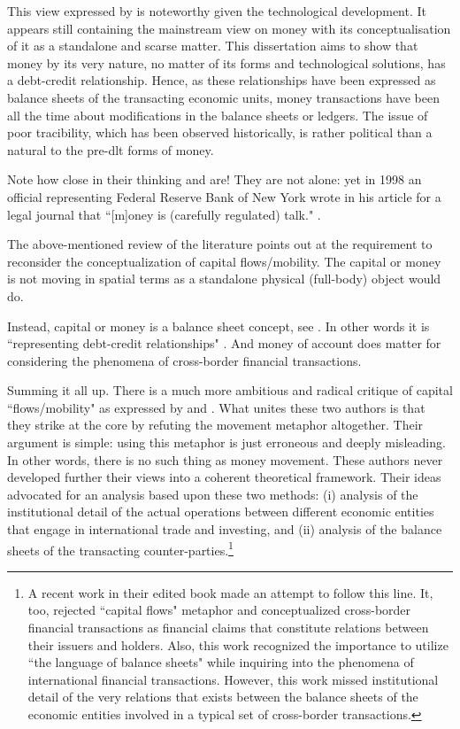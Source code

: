 This view expressed by \citeauthor{westermeier2023} is noteworthy given the technological development. It appears still containing the mainstream view on money with its conceptualisation of it as a standalone and scarse matter. This dissertation aims to show that money by its very nature, no matter of its forms and technological solutions, has a debt-credit relationship. Hence, as these relationships have been expressed as balance sheets of the transacting economic units, money transactions have been all the time about modifications in the balance sheets or ledgers. The issue of poor tracibility, which has been observed historically, is rather political than a natural to the pre-\ac{dlt} forms of money. 

Note how close in their thinking \cite{westermeier2023} and \cite{scott2022} are! They are not alone: yet in 1998 an official representing Federal Reserve Bank of New York wrote in his article for a legal journal that ``[m]oney is (carefully regulated) talk." \citep[p.~7]{sommer1998}.

The above-mentioned review of the literature points out at the requirement to reconsider the conceptualization of capital flows/mobility. The capital or money is not moving in spatial terms as a standalone physical (full-body) object would do.

Instead, capital or money is a balance sheet concept, see \citep{bell2001}. In other words it is ``representing debt-credit relationships" \citep[p.~17]{kregel1996}. And money of account does matter for considering the phenomena of cross-border financial transactions.

Summing it all up. There is a much more ambitious and radical critique of capital ``flows/mobility" as expressed by \cite{woodruff2005} and \cite{mosler2005,mosler2010,mosler2022,mosler2023}. What unites these two authors is that they strike at the core by refuting the movement metaphor altogether. Their argument is simple: using this metaphor is just erroneous and deeply misleading. In other words, there is no such thing as money movement.
These authors never developed further their views into a coherent theoretical framework.
Their ideas advocated for an analysis based upon these two methods: (i) analysis of the institutional detail of the actual operations between different economic entities that engage in international trade and investing, and (ii) analysis of the balance sheets of the transacting counter-parties.\footnote{A recent work \citep{braun_kodd2022} in their edited book \citep{braun2022} made an attempt to follow this line. It, too, rejected ``capital flows" metaphor and conceptualized cross-border financial transactions as financial claims that constitute relations between their issuers and holders.   Also, this work recognized the importance to utilize ``the language of balance sheets" while inquiring into the phenomena of international financial transactions.  However, this work missed institutional detail of the very relations that exists between the balance sheets of the economic entities involved in a typical set of cross-border transactions.}

